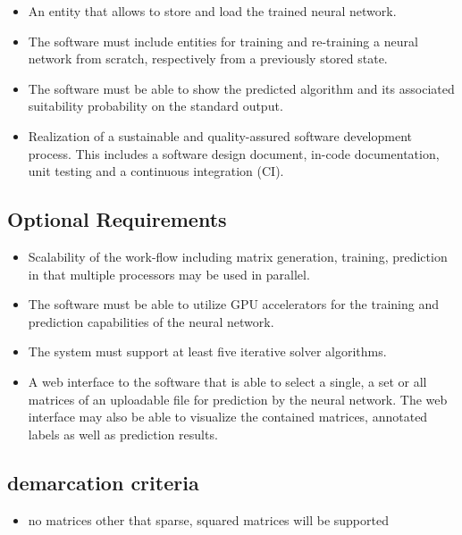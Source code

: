 \documentclass[parskip=full]{scrartcl}
\begin{document}
\begin{itemize}
\item An entity that allows to store and load the trained neural network.

\item The software must include entities for training and re-training a neural network from scratch, respectively from a previously stored state.

\item The software must be able to show the predicted algorithm and its associated suitability probability on the standard output.

\item Realization of a sustainable and quality-assured software development process. This includes a software design document, in-code documentation, unit testing and a continuous integration (CI).

\end{itemize}

\subsection{Optional Requirements}

\begin{itemize}
    
\item Scalability of the work-flow including matrix generation, training, prediction in that multiple processors may be used in parallel.

\item The software must be able to utilize GPU accelerators for the training and prediction capabilities of the neural network.

\item The system must support at least five iterative solver algorithms.

\item A web interface to the software that is able to select a single, a set or all matrices of an uploadable file for prediction by the neural network. The web interface may also be able to visualize the contained matrices, annotated labels as well as prediction results.

\end{itemize}

\subsection{demarcation criteria}
\begin{itemize}
\item no matrices other that sparse, squared matrices will be supported
\end{itemize}
\end{document}

